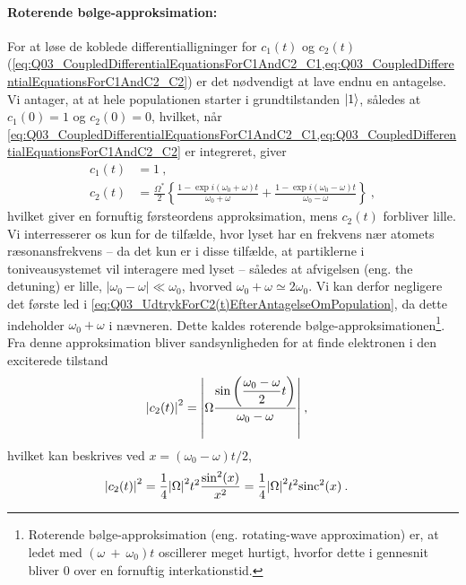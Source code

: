 \paragraph{Roterende bølge-approksimation:} For at løse de koblede differentialligninger for $c_1(t)$ og $c_2(t)$ (\cref{eq:Q03_CoupledDifferentialEquationsForC1AndC2_C1,eq:Q03_CoupledDifferentialEquationsForC1AndC2_C2}) er det nødvendigt at lave endnu en antagelse. Vi antager, at at hele populationen starter i grundtilstanden $\ket{1}$, således at $c_1(0) = 1$ og $c_2(0) = 0$, hvilket, når \cref{eq:Q03_CoupledDifferentialEquationsForC1AndC2_C1,eq:Q03_CoupledDifferentialEquationsForC1AndC2_C2} er integreret, giver
\begin{align}
    c_1(t) &= 1 \: , \label{eq:Q03_UdtrykForC1(t)EfterAntagelseOmPopulation}\\
    c_2(t) &= \frac{\Omega^*}{2} \left\{\frac{1 - \exp{i(\omega_0 + \omega)t}}{\omega_0 + \omega} + \frac{1 - \exp{i(\omega_0 - \omega)t}}{\omega_0 - \omega}\right\} \: , \label{eq:Q03_UdtrykForC2(t)EfterAntagelseOmPopulation}
\end{align}
hvilket giver en fornuftig førsteordens approksimation, mens $c_2(t)$ forbliver lille. Vi interresserer os kun for de tilfælde, hvor lyset har en frekvens nær atomets ræsonansfrekvens -- da det kun er i disse tilfælde, at partiklerne i toniveausystemet vil interagere med lyset -- således at afvigelsen (eng. the detuning) er lille, $|\omega_0 - \omega| \ll \omega_0$, hvorved $\omega_0 + \omega \simeq 2\omega_0$. Vi kan derfor negligere det første led i \cref{eq:Q03_UdtrykForC2(t)EfterAntagelseOmPopulation}, da dette indeholder $\omega_0 + \omega$ i nævneren. Dette kaldes \textsf{roterende bølge-approksimationen}\footnote{Roterende bølge-approksimation (eng. rotating-wave approximation) er, at ledet med $(\omega~+~\omega_0)t$ oscillerer meget hurtigt, hvorfor dette i gennesnit bliver $0$ over en fornuftig interkationstid.}. Fra denne approksimation bliver sandsynligheden for at finde elektronen i den exciterede tilstand
\begin{align}
    \abs{c_2(t)}^2 &= \abs{\Omega \dfrac{\sin\left(\dfrac{\omega_0 - \omega}{2}t\right)}{\omega_0 - \omega}} \: ,
\end{align}
hvilket kan beskrives ved $x = (\omega_0 - \omega)t/2$,
\begin{align} \label{eq:Q03_ExcitationProbabilityFunction}
    \abs{c_2(t)}^2 &= \frac{1}{4}\abs{\Omega}^2t^2\frac{\sin^2(x)}{x^2} = \frac{1}{4}\abs{\Omega}^2t^2\mathrm{sinc}^2(x) \: .
\end{align}
